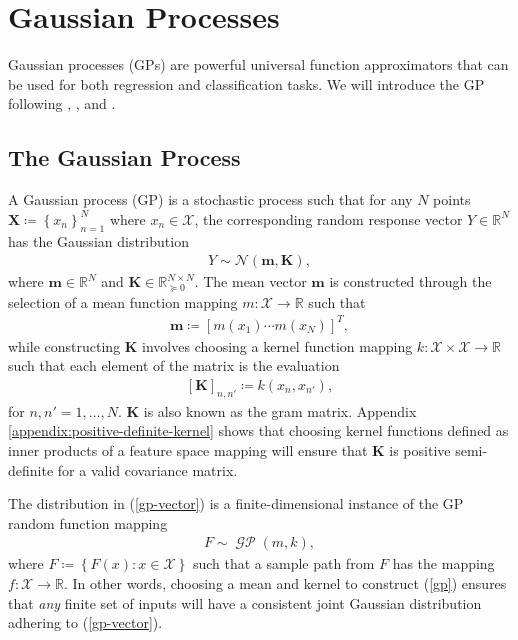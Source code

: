\documentclass{article}
\newcommand{\GP}{\operatorname{\mathcal{GP}}}
\numberwithin{equation}{section}
\begin{document}
\newpage
\section{Gaussian Processes}\label{section:gaussian-processes}
Gaussian processes (GPs) are powerful universal function approximators that can be used for both regression and classification tasks. We will introduce the GP following \cite{rasmussen2003gaussian}, \cite{matthews2017scalable}, and \cite{wild2022generalized}.

\subsection{The Gaussian Process}\label{section:the-gp}
A Gaussian process (GP) is a stochastic process such that for any $N$ points $\mathbf{X} \coloneqq \left\{ x_n\right\}_{n=1}^N$ where $x_n \in \mathcal{X}$, the corresponding random response vector $Y \in \mathbb{R}^N$ has the Gaussian distribution
\begin{align}
    \label{gp-vector}
    Y \sim \mathcal{N}\left(\mathbf{m}, \mathbf{K}\right),
\end{align}
where $\mathbf{m} \in \mathbb{R}^N$ and $\mathbf{K} \in  \mathbb{R}^{N \times N}_{\succcurlyeq 0}$.
The mean vector $\mathbf{m}$ is constructed through the selection of a mean function mapping $m: \mathcal{X} \rightarrow \mathbb{R}$ such that
\begin{align}
    \label{gp-mean-vector}
    \mathbf{m} \coloneqq \left[ m(x_1) \cdots m(x_N)\right]^T,
\end{align}
while constructing $\mathbf{K}$ involves choosing a kernel function mapping $k: \mathcal{X} \times \mathcal{X} \rightarrow \mathbb{R}$ such that each element of the matrix is the evaluation
\begin{align}
    \label{gp-kernel-matrix}
    \left[\mathbf{K}\right]_{n, n'} \coloneqq k(x_n, x_{n'}),
\end{align}
for $n, n'=1,\dots, N$.
$\mathbf{K}$ is also known as the gram matrix.
Appendix \ref{appendix:positive-definite-kernel} shows that choosing kernel functions defined as inner products of a feature space mapping will ensure that $\mathbf{K}$ is positive semi-definite for a valid covariance matrix.


The distribution in (\ref{gp-vector}) is a finite-dimensional instance of the GP random function mapping
\begin{align}
    F \sim \GP(m, k),
    \label{gp}
\end{align}
 where $F \coloneqq \left\{F(x): x \in \mathcal{X}\right\}$ such that a sample path from $F$ has the mapping $f: \mathcal{X} \rightarrow \mathbb{R}$.
In other words, choosing a mean and kernel to construct (\ref{gp}) ensures that \textit{any} finite set of inputs will have a consistent joint Gaussian distribution adhering to (\ref{gp-vector}).
\end{document}
